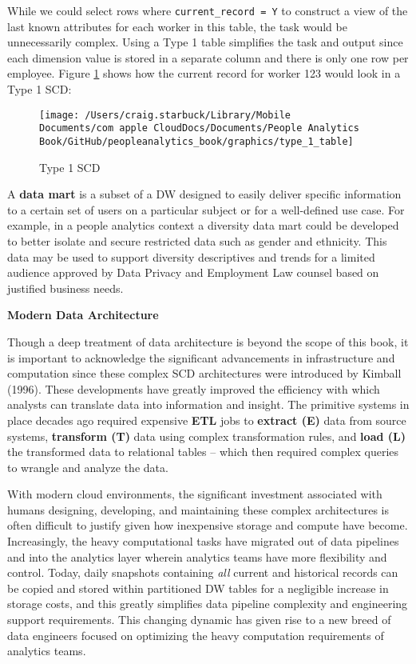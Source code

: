 \documentclass[
]{book}
\begin{document}
While we could select rows where \texttt{current\_record\ =\ \textquotesingle{}Y\textquotesingle{}} to construct a view of the last known attributes for each worker in this table, the task would be unnecessarily complex. Using a Type 1 table simplifies the task and output since each dimension value is stored in a separate column and there is only one row per employee. Figure \ref{fig:type-1-tbl} shows how the current record for worker 123 would look in a Type 1 SCD:

\begin{figure}

{\centering \texttt{[image: /Users/craig.starbuck/Library/Mobile Documents/com~apple~CloudDocs/Documents/People Analytics Book/GitHub/peopleanalytics\_book/graphics/type\_1\_table]} 

}

\caption{Type 1 SCD}\label{fig:type-1-tbl}
\end{figure}

A \textbf{data mart} is a subset of a DW designed to easily deliver specific information to a certain set of users on a particular subject or for a well-defined use case. For example, in a people analytics context a diversity data mart could be developed to better isolate and secure restricted data such as gender and ethnicity. This data may be used to support diversity descriptives and trends for a limited audience approved by Data Privacy and Employment Law counsel based on justified business needs.

\textbf{Modern Data Architecture}

Though a deep treatment of data architecture is beyond the scope of this book, it is important to acknowledge the significant advancements in infrastructure and computation since these complex SCD architectures were introduced by Kimball (1996). These developments have greatly improved the efficiency with which analysts can translate data into information and insight. The primitive systems in place decades ago required expensive \textbf{ETL} jobs to \textbf{extract (E)} data from source systems, \textbf{transform (T)} data using complex transformation rules, and \textbf{load (L)} the transformed data to relational tables -- which then required complex queries to wrangle and analyze the data.

With modern cloud environments, the significant investment associated with humans designing, developing, and maintaining these complex architectures is often difficult to justify given how inexpensive storage and compute have become. Increasingly, the heavy computational tasks have migrated out of data pipelines and into the analytics layer wherein analytics teams have more flexibility and control. Today, daily snapshots containing \emph{all} current and historical records can be copied and stored within partitioned DW tables for a negligible increase in storage costs, and this greatly simplifies data pipeline complexity and engineering support requirements. This changing dynamic has given rise to a new breed of data engineers focused on optimizing the heavy computation requirements of analytics teams.
\end{document}

